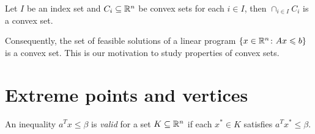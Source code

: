 \begin{proposition}
  \label{lem:1}
  Let $I$ be an index set and $C_i \subseteq \mathbb{R}^n$ be convex sets for
  each $i \in I$, then $\cap_{i \in I}C_i$ is a convex set.
\end{proposition}

Consequently, the set of feasible solutions of a linear program $\{x
\in \mathbb{R}^n \colon Ax \leqslant b\}$ is a convex set. This is our motivation
to study properties of convex sets.


\section{Extreme points and vertices}
\label{sec:extr-points-vert}


\begin{definition}
  An inequality $a^Tx \leq \beta$ is \emph{valid} for a  set $K \subseteq \mathbb{R}^n$ if each $x^* \in K$ satisfies $a^Tx^* \leq \beta$. 
\end{definition}



     
      
      
      
      
          
      
          
    
